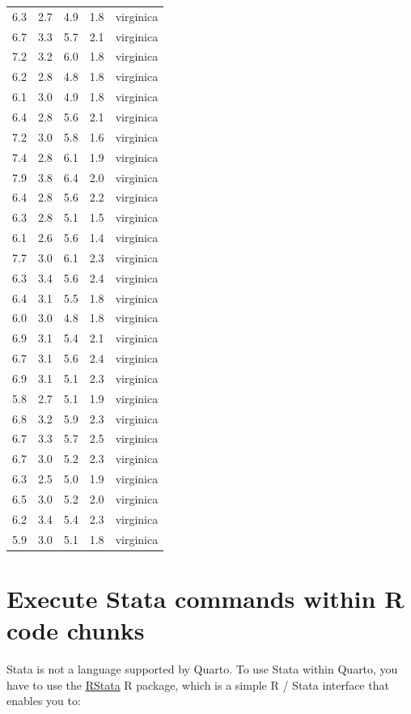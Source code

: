 \documentclass[
  letterpaper,
  DIV=11,
  numbers=noendperiod,
  oneside]{scrreprt}
\begin{document}
\begin{longtable}[]{@{}rrrrl@{}}
6.3 & 2.7 & 4.9 & 1.8 & virginica \\
6.7 & 3.3 & 5.7 & 2.1 & virginica \\
7.2 & 3.2 & 6.0 & 1.8 & virginica \\
6.2 & 2.8 & 4.8 & 1.8 & virginica \\
6.1 & 3.0 & 4.9 & 1.8 & virginica \\
6.4 & 2.8 & 5.6 & 2.1 & virginica \\
7.2 & 3.0 & 5.8 & 1.6 & virginica \\
7.4 & 2.8 & 6.1 & 1.9 & virginica \\
7.9 & 3.8 & 6.4 & 2.0 & virginica \\
6.4 & 2.8 & 5.6 & 2.2 & virginica \\
6.3 & 2.8 & 5.1 & 1.5 & virginica \\
6.1 & 2.6 & 5.6 & 1.4 & virginica \\
7.7 & 3.0 & 6.1 & 2.3 & virginica \\
6.3 & 3.4 & 5.6 & 2.4 & virginica \\
6.4 & 3.1 & 5.5 & 1.8 & virginica \\
6.0 & 3.0 & 4.8 & 1.8 & virginica \\
6.9 & 3.1 & 5.4 & 2.1 & virginica \\
6.7 & 3.1 & 5.6 & 2.4 & virginica \\
6.9 & 3.1 & 5.1 & 2.3 & virginica \\
5.8 & 2.7 & 5.1 & 1.9 & virginica \\
6.8 & 3.2 & 5.9 & 2.3 & virginica \\
6.7 & 3.3 & 5.7 & 2.5 & virginica \\
6.7 & 3.0 & 5.2 & 2.3 & virginica \\
6.3 & 2.5 & 5.0 & 1.9 & virginica \\
6.5 & 3.0 & 5.2 & 2.0 & virginica \\
6.2 & 3.4 & 5.4 & 2.3 & virginica \\
5.9 & 3.0 & 5.1 & 1.8 & virginica \\
\bottomrule()
\end{longtable}

\hypertarget{execute-stata-commands-within-r-code-chunks}{%
\section{Execute Stata commands within R code
chunks}\label{execute-stata-commands-within-r-code-chunks}}

Stata is not a language supported by Quarto. To use Stata within Quarto,
you have to use the
\href{https://cran.r-project.org/web/packages/RStata/README.html}{RStata}
R package, which is a simple R / Stata interface that enables you to:
\end{document}
